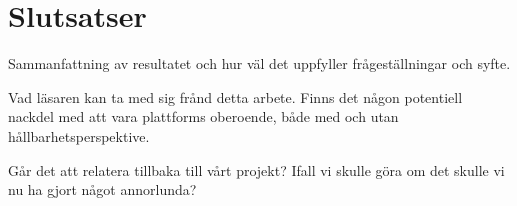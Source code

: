 \section{Slutsatser}
\label{sec:joel_a-conclusion}
Sammanfattning av resultatet och hur väl det uppfyller frågeställningar och syfte.


Vad läsaren kan ta med sig frånd detta arbete. Finns det någon potentiell nackdel med att vara plattforms oberoende, både med och utan hållbarhetsperspektive.

Går det att relatera tillbaka till vårt projekt? Ifall vi skulle göra om det skulle vi nu ha gjort något annorlunda?
